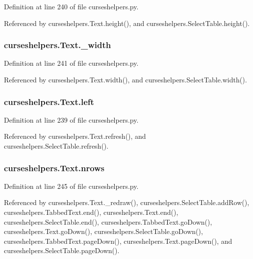 Definition at line 240 of file curseshelpers.\-py.



Referenced by curseshelpers.\-Text.\-height(), and curseshelpers.\-Select\-Table.\-height().

\subsubsection[{\-\_\-width}]{\setlength{\rightskip}{0pt plus 5cm}curseshelpers.\-Text.\-\_\-width\hspace{0.3cm}{\ttfamily [private]}}\label{classcurseshelpers_1_1Text_af1233fa6fe021ca2755165214cf0746e}


Definition at line 241 of file curseshelpers.\-py.



Referenced by curseshelpers.\-Text.\-width(), and curseshelpers.\-Select\-Table.\-width().

\subsubsection[{left}]{\setlength{\rightskip}{0pt plus 5cm}curseshelpers.\-Text.\-left}\label{classcurseshelpers_1_1Text_a54907ebaeb319b047d9b91ff92db743d}


Definition at line 239 of file curseshelpers.\-py.



Referenced by curseshelpers.\-Text.\-refresh(), and curseshelpers.\-Select\-Table.\-refresh().

\subsubsection[{nrows}]{\setlength{\rightskip}{0pt plus 5cm}curseshelpers.\-Text.\-nrows}\label{classcurseshelpers_1_1Text_aff1dcc1b7a0ddec14bbff154e00361de}


Definition at line 245 of file curseshelpers.\-py.



Referenced by curseshelpers.\-Text.\-\_\-redraw(), curseshelpers.\-Select\-Table.\-add\-Row(), curseshelpers.\-Tabbed\-Text.\-end(), curseshelpers.\-Text.\-end(), curseshelpers.\-Select\-Table.\-end(), curseshelpers.\-Tabbed\-Text.\-go\-Down(), curseshelpers.\-Text.\-go\-Down(), curseshelpers.\-Select\-Table.\-go\-Down(), curseshelpers.\-Tabbed\-Text.\-page\-Down(), curseshelpers.\-Text.\-page\-Down(), and curseshelpers.\-Select\-Table.\-page\-Down().

